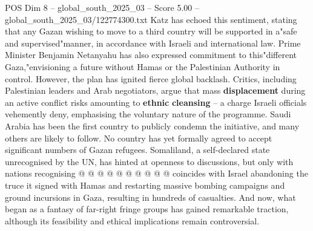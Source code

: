 \begin{textsample}{POS Dim 8 – global\_south\_2025\_03 – Score 5.00 – global\_south\_2025\_03/122774300.txt}
Katz has echoed this sentiment, stating that any Gazan wishing to move to a third country will be supported in a"safe and supervised"manner, in accordance with Israeli and international law.
Prime Minister Benjamin Netanyahu has also expressed commitment to this"different Gaza,"envisioning a future without Hamas or the Palestinian Authority in control.
However, the plan has ignited fierce global backlash.
Critics, including Palestinian leaders and Arab negotiators, argue that mass \textbf{displacement} during an active conflict risks amounting to \textbf{ethnic} \textbf{cleansing} -- a charge Israeli officials vehemently deny, emphasising the voluntary nature of the programme.
Saudi Arabia has been the first country to publicly condemn the initiative, and many others are likely to follow.
No country has yet formally agreed to accept significant numbers of Gazan refugees.
Somaliland, a self-declared state unrecognised by the UN, has hinted at openness to discussions, but only with nations recognising @ @ @ @ @ @ @ @ @ @ coincides with Israel abandoning the truce it signed with Hamas and restarting massive bombing campaigns and ground incursions in Gaza, resulting in hundreds of casualties.
And now, what began as a fantasy of far-right fringe groups has gained remarkable traction, although its feasibility and ethical implications remain controversial.

\end{textsample}
